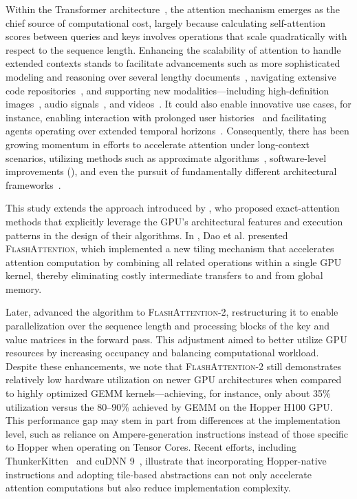 Within the Transformer architecture~\citep{vaswani2017attention}, the attention mechanism emerges as the chief source of computational cost, largely because calculating self-attention scores between queries and keys involves operations that scale quadratically with respect to the sequence length. Enhancing the scalability of attention to handle extended contexts stands to facilitate advancements such as more sophisticated modeling and reasoning over several lengthy documents~\citep{guo2021longt5,shaham2022scrolls,peng2023yarn}, navigating extensive code repositories~\citep{roziere2023code, li2023starcoder}, and supporting new modalities—including high-definition images~\citep{chen2022scaling}, audio signals~\citep{gulati2020conformer}, and videos~\citep{ho2022video}. It could also enable innovative use cases, for instance, enabling interaction with prolonged user histories~\citep{sun2019bert4rec} and facilitating agents operating over extended temporal horizons~\citep{yao2022react}. Consequently, there has been growing momentum in efforts to accelerate attention under long-context scenarios, utilizing methods such as approximate algorithms~\citep{katharopoulos2020transformers,choromanski2020rethinking,
tay2020efficient}, software-level improvements (\citep{rabe2021self,dao2022flashattention,kwon2023efficient}), and even the pursuit of fundamentally different architectural frameworks~\citep{peng2023rwkv,sun2023retentive,gu2023mamba}.

This study extends the approach introduced by \citet{dao2022flashattention}, who proposed exact-attention methods that explicitly leverage the GPU’s architectural features and execution patterns in the design of their algorithms. In \citep{dao2022flashattention}, Dao et al. presented \textsc{FlashAttention}, which implemented a new tiling mechanism that accelerates attention computation by combining all related operations within a single GPU kernel, thereby eliminating costly intermediate transfers to and from global memory.

Later, \citet{dao2023flashattention2} advanced the algorithm to \textsc{FlashAttention-2}, restructuring it to enable parallelization over the sequence length and processing blocks of the key and value matrices in the forward pass. This adjustment aimed to better utilize GPU resources by increasing occupancy and balancing computational workload. Despite these enhancements, we note that \textsc{FlashAttention-2} still demonstrates relatively low hardware utilization on newer GPU architectures when compared to highly optimized GEMM kernels—achieving, for instance, only about 35\% utilization versus the 80–90\% achieved by GEMM on the Hopper H100 GPU. This performance gap may stem in part from differences at the implementation level, such as reliance on Ampere-generation instructions instead of those specific to Hopper when operating on Tensor Cores. Recent efforts, including ThunkerKitten~\citep{spector2024thunder} and cuDNN 9~\citep{cudnn9}, illustrate that incorporating Hopper-native instructions and adopting tile-based abstractions can not only accelerate attention computations but also reduce implementation complexity.

